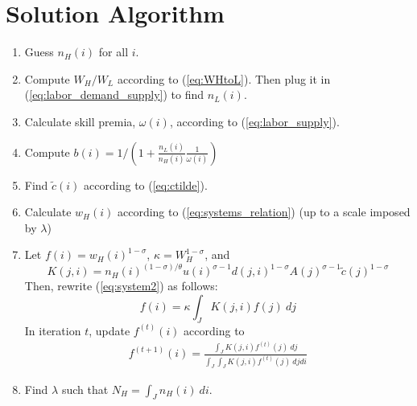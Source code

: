 \documentclass{article}
\begin{document}
% 
% 
% 
% 

\newpage




\appendix
\section{Solution Algorithm}
\label{sec:sol_alg}

\begin{enumerate}
\item Guess $n_H(i)$ for all $i$.
\item Compute $W_H/W_L$ according to (\ref{eq:WHtoL}). Then plug it in (\ref{eq:labor_demand_supply}) to find $n_L(i)$.
\item Calculate skill premia, $\omega(i)$, according to (\ref{eq:labor_supply}).
\item Compute $b(i)
= 1/(1 + \frac{n_L(i)}{n_H(i)} \frac{1}{\omega(i)})$
\item Find $\tilde{c}(i)$ according to (\ref{eq:ctilde}).
\item Calculate $w_H(i)$ according to (\ref{eq:systems_relation}) (up to a scale imposed by $\lambda$)
\item Let $f(i)=w_H(i)^{1-\sigma}$, $\kappa=W_H^{1-\sigma}$, and
\[
K(j,i) = n_H(i)^{(1-\sigma)/\theta}u(i)^{\sigma-1} d(j,i)^{1-\sigma} A(j)^{\sigma-1} \tilde{c}(j)^{1-\sigma}
\]
Then, rewrite (\ref{eq:system2}) as follows:
\[
f(i) = \kappa \int_J K(j,i) f(j)~dj
\]
In iteration $t$, update $f^{(t)}(i)$ according to
\begin{eqnarray}
	f^{(t+1)}(i) = \frac{\int_J K(j,i) f^{(t)}(j)~dj}{\int_J \int_J K(j,i) f^{(t)}(j)~dj di}
\end{eqnarray}
\item Find $\lambda$ such that $N_H=\int_J n_H(i)~di$.
\end{enumerate}
\end{document}
